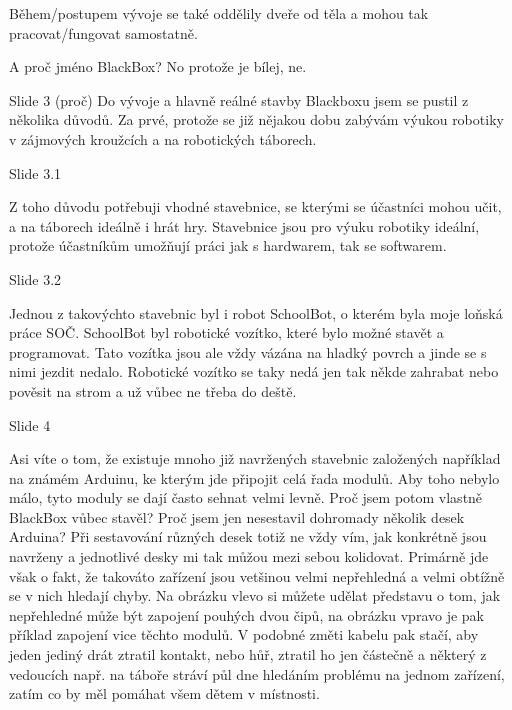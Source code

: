Během/postupem vývoje se také oddělily dveře od těla a mohou tak pracovat/fungovat samostatně.

A proč jméno BlackBox? No protože je bílej, ne. %


Slide 3 (proč)
Do vývoje a hlavně reálné stavby Blackboxu jsem se pustil z několika důvodů. Za prvé, protože se již nějakou dobu zabývám 
výukou robotiky v zájmových kroužcích a na robotických táborech. 

    Slide 3.1

    Z toho důvodu potřebuji 
    vhodné stavebnice, se kterými se účastníci mohou učit, a na táborech ideálně i hrát hry.
    Stavebnice jsou pro výuku robotiky ideální, protože účastníkům umožňují práci jak 
    s hardwarem, tak se softwarem. 

    Slide 3.2

    Jednou z takovýchto stavebnic byl i robot SchoolBot, o kterém byla moje loňská práce SOČ.
    SchoolBot byl robotické vozítko, které bylo možné stavět a programovat.  
    Tato vozítka jsou ale vždy vázána na hladký povrch a jinde se s nimi jezdit nedalo.
    Robotické vozítko se taky nedá jen tak někde zahrabat nebo pověsit na strom a už vůbec ne třeba do deště. 


Slide 4 

Asi víte o tom, že existuje mnoho již navržených stavebnic založených například na známém Arduinu, 
ke kterým jde připojit celá řada modulů. Aby toho nebylo málo, tyto moduly se dají často sehnat velmi levně. 
Proč jsem potom vlastně BlackBox vůbec stavěl? Proč jsem jen nesestavil dohromady několik desek Arduina? 
Při sestavování různých desek
totiž ne vždy vím, jak konkrétně jsou navrženy a jednotlivé desky mi tak můžou mezi sebou kolidovat.
Primárně jde však o fakt, že takováto zařízení jsou vetšinou velmi nepřehledná a velmi obtížně se v nich hledají chyby. 
Na obrázku vlevo si můžete udělat představu o tom, jak nepřehledné může být zapojení pouhých dvou čipů, 
na obrázku vpravo je pak příklad zapojení vice těchto modulů. V podobné změti kabelu pak stačí, aby jeden jediný drát 
ztratil kontakt, nebo hůř, ztratil ho jen částečně a některý z vedoucích např. na táboře stráví půl dne hledáním problému 
na jednom zařízení, zatím co by měl pomáhat všem dětem v místnosti.

